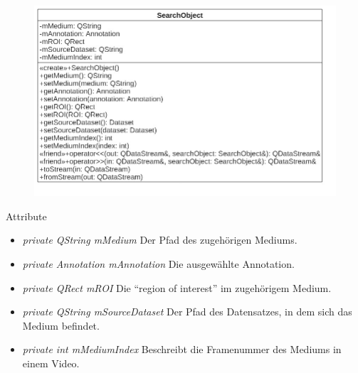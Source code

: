 \begin{figure}[H]
\centering
\includegraphics[scale=0.5]{img/Klassendiagramm/Klassen/SearchObject}
\label{fig:searchObject}
\end{figure}

Attribute
\begin{itemize}
\item\textit{private QString mMedium} Der Pfad des zugehörigen Mediums.
\item\textit{private Annotation mAnnotation} Die ausgewählte Annotation.
\item\textit{private QRect mROI} Die \enquote{region of interest} im zugehörigem Medium.
\item\textit{private QString mSourceDataset} Der Pfad des Datensatzes, in dem sich das Medium befindet.
\item\textit{private int mMediumIndex} Beschreibt die Framenummer des Mediums in einem Video.
\end{itemize}

